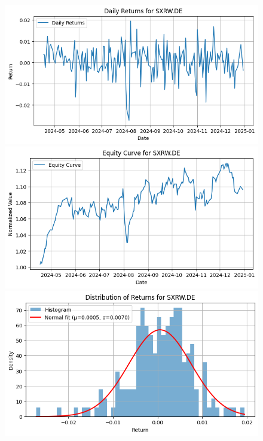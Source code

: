 \documentclass{article}%
\begin{document}
\begin{figure}[htbp]%
\begin{minipage}{0.31\textwidth}%
\includegraphics[width=\linewidth]{ticker_images/SXRW.DE_daily_returns.png}%
\end{minipage}%
\begin{minipage}{0.31\textwidth}%
\includegraphics[width=\linewidth]{ticker_images/SXRW.DE_equity_curve.png}%
\end{minipage}%
\begin{minipage}{0.31\textwidth}%
\includegraphics[width=\linewidth]{ticker_images/SXRW.DE_return_distribution.png}%
\end{minipage}%
\end{figure}
\end{document}

